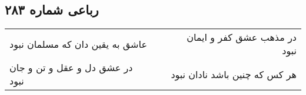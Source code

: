 \begin{center}
\section*{رباعی شماره ۲۸۳}
\label{sec:sh283}
\begin{longtable}{l p{0.5cm} r}
عاشق به یقین دان که مسلمان نبود
&&
در مذهب عشق کفر و ایمان نبود
\\
در عشق دل و عقل و تن و جان نبود
&&
هر کس که چنین باشد نادان نبود
\\
\end{longtable}
\end{center}
